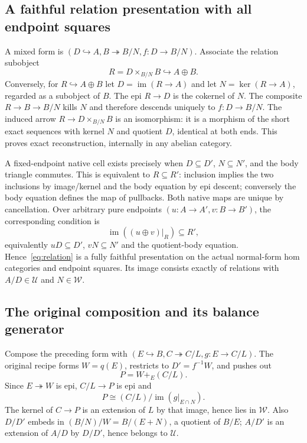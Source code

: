 \documentclass[11pt,a4paper]{article}
\theoremstyle{definition}
\newcommand{\Uclass}{\mathcal U}
\newcommand{\Wclass}{\mathcal W}
\newcommand{\im}{\operatorname{im}}
\begin{document}
\subsection{A faithful relation presentation with all endpoint squares}
A mixed form is $(D\hookrightarrow A,B\twoheadrightarrow B/N,f:D\to B/N)$.
Associate the relation subobject
\begin{equation}\label{eq:relation}
 R=D\times_{B/N}B\hookrightarrow A\oplus B.
\end{equation}
Conversely, for $R\hookrightarrow A\oplus B$ let $D=\im(R\to A)$ and let
$N=\ker(R\to A)$, regarded as a subobject of $B$. The epi $R\to D$ is the
cokernel of $N$. The composite $R\to B\to B/N$ kills $N$ and therefore
descends uniquely to $f:D\to B/N$. The induced arrow
$R\to D\times_{B/N}B$ is an isomorphism: it is a morphism of the short exact
sequences with kernel $N$ and quotient $D$, identical at both ends. This proves
exact reconstruction, internally in any abelian category.

A fixed-endpoint native cell exists precisely when $D\subseteq D'$,
$N\subseteq N'$, and the body triangle commutes. This is equivalent to
$R\subseteq R'$: inclusion implies the two inclusions by image/kernel and the
body equation by epi descent; conversely the body equation defines the map of
pullbacks. Both native maps are unique by cancellation. Over arbitrary pure
endpoints $(u:A\to A',v:B\to B')$, the corresponding condition is
\[
 \im((u\oplus v)|_R)\subseteq R',
\]
equivalently $uD\subseteq D'$, $vN\subseteq N'$ and the quotient-body equation.
Hence~\eqref{eq:relation} is a fully faithful presentation on the actual
normal-form hom categories and endpoint squares. Its image consists exactly
of relations with $A/D\in\Uclass$ and $N\in\Wclass$.

\subsection{The original composition and its balance generator}
Compose the preceding form with
$(E\hookrightarrow B,C\twoheadrightarrow C/L,g:E\to C/L)$.
The original recipe forms $W=q(E)$, restricts to $D'=f^{-1}W$, and pushes out
\[
 P=W+_E(C/L).
\]
Since $E\twoheadrightarrow W$ is epi, $C/L\to P$ is epi and
\[
 P\cong(C/L)/\im(g|_{E\cap N}).
\]
The kernel of $C\to P$ is an extension of $L$ by that image, hence lies in
$\Wclass$. Also $D/D'$ embeds in $(B/N)/W=B/(E+N)$, a quotient of $B/E$;
$A/D'$ is an extension of $A/D$ by $D/D'$, hence belongs to $\Uclass$.
\end{document}
